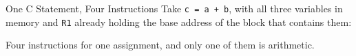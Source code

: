 \documentclass[9pt,aspectratio=169,xcolor=table]{beamer}
\begin{document}
\begin{frame}[fragile]{One C Statement, Four Instructions}
    \leavevmode
    {\small Take \texttt{c = a + b}, with all three variables in memory and
    \texttt{R1} already holding the base address of the block that contains
    them:}

    \vspace{2mm}
    \begin{center}
    \end{center}

    \vspace{2mm}
    {\small Four instructions for one assignment, and only one of them
    is arithmetic.}
\end{frame}
\end{document}

